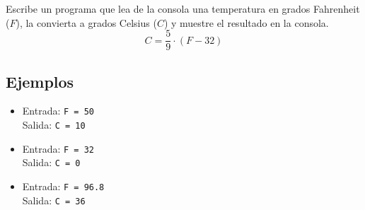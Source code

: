 Escribe un programa que lea de la consola una temperatura en grados Fahrenheit (\(F\)), la convierta a grados Celsius (\(C\)) y muestre el resultado en la consola.\\ 
\[
C = \frac{5}{9} \cdot (F - 32)
\]
\subsection*{Ejemplos}
\begin{itemize}
    \item Entrada: \texttt{F = 50}\\
          Salida: \texttt{C = 10}
    \item Entrada: \texttt{F = 32}\\
          Salida: \texttt{C = 0}
    \item Entrada: \texttt{F = 96.8}\\
          Salida: \texttt{C = 36}
\end{itemize}